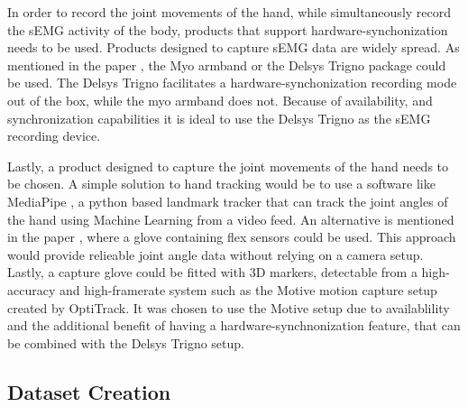 \documentclass[../main.tex]{subfiles}
\begin{document}
In order to record the joint movements of the hand, while simultaneously record the sEMG activity of the body, products that support hardware-synchonization needs to be used.
Products designed to capture sEMG data are widely spread.
As mentioned in the paper \cite{Zhaolong2021}, the Myo armband \cite{myo} or the Delsys Trigno package \cite{emgworks} could be used.
The Delsys Trigno \cite{emgworks} facilitates a hardware-synchonization recording mode out of the box, while the myo armband \cite{myo} does not.
Because of availability, and synchronization capabilities it is ideal to use the Delsys Trigno as the sEMG recording device.

Lastly, a product designed to capture the joint movements of the hand needs to be chosen.
A simple solution to hand tracking would be to use a software like MediaPipe \cite{mediapipe}, a python based landmark tracker that can track the joint angles of the hand using Machine Learning from a video feed.
An alternative is mentioned in the paper \cite{Zhaolong2021}, where a glove containing flex sensors could be used.
This approach would provide relieable joint angle data without relying on a camera setup.
Lastly, a capture glove could be fitted with 3D markers, detectable from a high-accuracy and high-framerate system such as the Motive motion capture setup \cite{optitrack} created by OptiTrack.
It was chosen to use the Motive setup due to availablility and the additional benefit of having a hardware-synchnonization feature, that can be combined with the Delsys Trigno \cite{emgworks} setup.


\subsection{Dataset Creation}
\label{sec:dataset}
\end{document}
